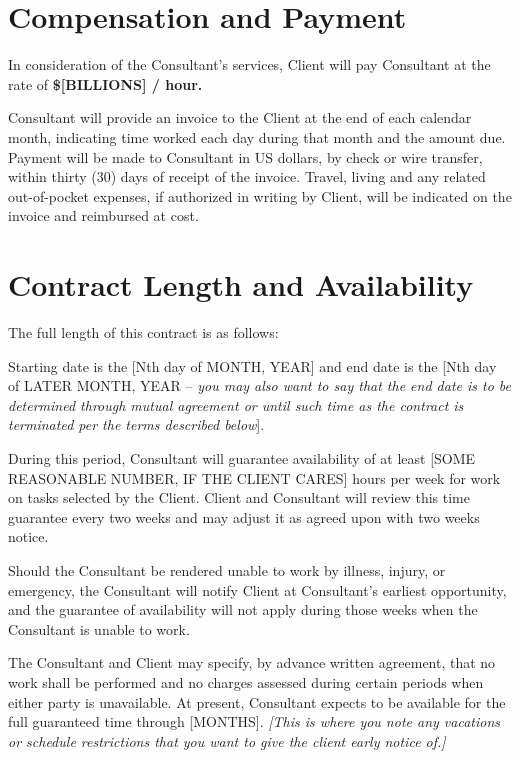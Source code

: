 \documentclass[10pt]{article}
\begin{document}
	
	\section{Compensation and Payment}
	
	In consideration of the Consultant's services, Client will pay
	Consultant at the rate of {\bf \$[BILLIONS] / hour.}
	
	Consultant will provide an invoice to the Client at the end of each calendar
	month, indicating time worked each day during that month and the
	amount due.  Payment will be made to Consultant in US dollars, by check or
	wire transfer, within thirty (30) days of receipt of the invoice.  Travel,
	living and any related out-of-pocket expenses, if authorized in writing by
	Client, will be indicated on the invoice and reimbursed at cost.
	
	
	\section{Contract Length and Availability}
	
	The full length of this contract is as follows:
	
	Starting date is the [Nth day of MONTH, YEAR] and end date is the [Nth day of LATER MONTH, YEAR -- {\em you may also want to say that the end date is to be determined through mutual agreement or until such time as the contract is terminated per the terms described below}].
	
	During this period, Consultant will guarantee availability of at least [SOME REASONABLE NUMBER, IF THE CLIENT CARES]
	hours per week for work on tasks selected by the Client.  Client and
	Consultant will review this time guarantee every two weeks and may adjust it
	as agreed upon with two weeks notice.
	
	Should the Consultant be rendered unable to work by illness, injury, or
	emergency, the Consultant will notify Client at Consultant's earliest
	opportunity, and the guarantee of availability will not apply during those
	weeks when the Consultant is unable to work.
	
	The Consultant and Client may specify, by advance written agreement, that no
	work shall be performed and no charges assessed during certain periods when
	either party is unavailable.  At present, Consultant expects to be available
	for the full guaranteed time through [MONTHS]. {\em [This is where you note any vacations or schedule restrictions that you want to give the client early notice of.]}
	
\end{document}

